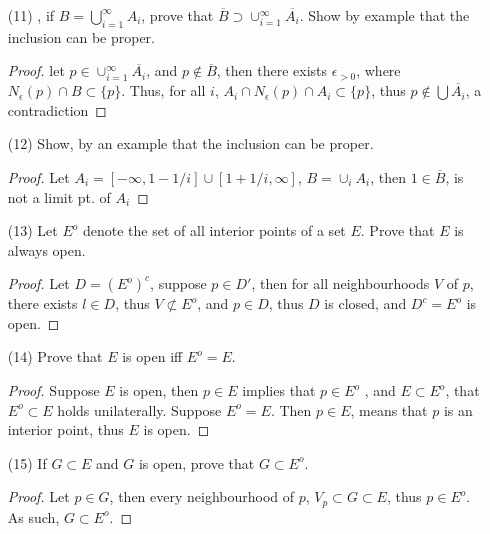 \documentclass{amsart}
\numberwithin{equation}{section}
\theoremstyle{plain}
\theoremstyle{definition}
\begin{document}
\begin{enumerate}
  \begin{proof}
    Notice, $B \subset \bigcup \overline{A_n}$. Suppose $p \in \bigcup \overline{A_n} \backslash \overline{B_n}$, then $p \in B_n'$, and $p \in \overline{B_n}$, 
    thus $\bigcup \overline{A_n} \backslash \overline{B_n} = \emptyset$, and $\bigcup \overline{A_n} \subset \overline{B_n}$, furthermore, $\bigcup \overline{A_n}$ is closed. As such,
    $\bigcup \overline{A_n} = \overline{B_n}$. 
  \end{proof}
  \item[(11)], if $B = \bigcup_{i=1}^{\infty} A_i$, prove that $\overline{B} \supset \cup_{i=1}^{\infty} \overline{A_i}$. Show by example that the inclusion can be proper.
  \begin{proof}
    let $p \in \cup_{i = 1}^{\infty} \overline{A_i}$, and $p \not \in \overline{B}$, then there exists $\epsilon_{>0}$, where $N_{\epsilon}(p) \cap B \subset \{p\}$. Thus, for all $i$, $A_i \cap N_{\epsilon}(p) \cap A_i \subset \{p\}$, thus $p \not\in \bigcup \overline{A_i}$, a contradiction
  \end{proof}
  \item[(12)] Show, by an example that the inclusion can be proper.
  \begin{proof}
    Let $A_i = [-\infty, 1-1/i] \cup [1 + 1/i, \infty]$, $B = \cup_i A_i$, then $1 \in \overline{B}$, is not a limit pt. of $A_i$
  \end{proof}
  \item[(13)] Let $E^o$ denote the set of all interior points of a set $E$. Prove that $E$ is always open.
  \begin{proof}
    Let $D = (E^o)^c$, suppose $p \in D'$, then for all neighbourhoods $V$ of $p$, there exists $l \in D$, thus $V \not \subset E^o$, and $p \in D$, thus $D$ is closed,
    and $D^c = E^o$ is open.
  \end{proof}
  \item[(14)] Prove that $E$ is open iff $E^o = E$.
  \begin{proof}
    Suppose $E$ is open, then $p \in E$ implies that $p \in E^o$ , and $E \subset E^o$, that $E^o \subset E$ holds unilaterally.
    Suppose $E^o  = E$. Then $p \in E$, means that $p$ is an interior point, thus $E$ is open.
  \end{proof}
  \item[(15)] If $G \subset E$ and $G$ is open, prove that $G \subset E^o$.
  \begin{proof}
    Let $p \in G$, then every neighbourhood  of $p$, $V_p \subset G \subset E$, thus $p \in E^o$. As such, $G \subset E^o$.

\end{proof}
\end{enumerate}
\end{document}
